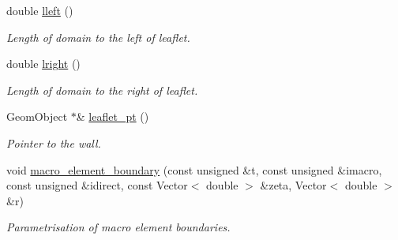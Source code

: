 \begin{DoxyCompactItemize}
double \hyperlink{classoomph_1_1ChannelWithLeafletDomain_a5538092062970dbd2f02218a05639d49}{lleft} ()
\begin{DoxyCompactList}\small\item\em Length of domain to the left of leaflet. \end{DoxyCompactList}\item 
double \hyperlink{classoomph_1_1ChannelWithLeafletDomain_aee74846110e70cd5538386e1ccb0ce7c}{lright} ()
\begin{DoxyCompactList}\small\item\em Length of domain to the right of leaflet. \end{DoxyCompactList}\item 
Geom\+Object $\ast$\& \hyperlink{classoomph_1_1ChannelWithLeafletDomain_a91d7d8d2f564c5e9d2ee07449b2653c9}{leaflet\+\_\+pt} ()
\begin{DoxyCompactList}\small\item\em Pointer to the wall. \end{DoxyCompactList}\item 
void \hyperlink{classoomph_1_1ChannelWithLeafletDomain_ae4b123847f4ab6e242a0409d72fe5cbd}{macro\+\_\+element\+\_\+boundary} (const unsigned \&t, const unsigned \&imacro, const unsigned \&idirect, const Vector$<$ double $>$ \&zeta, Vector$<$ double $>$ \&r)
\begin{DoxyCompactList}\small\item\em Parametrisation of macro element boundaries. \end{DoxyCompactList}\end{DoxyCompactItemize}
